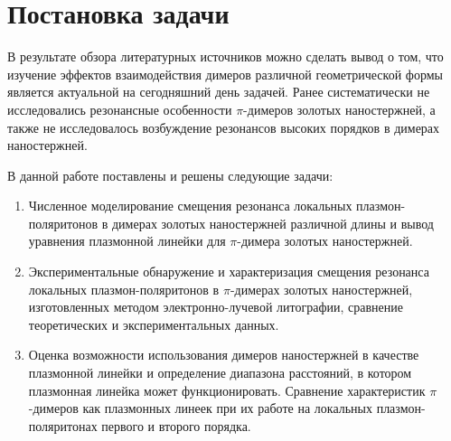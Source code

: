 \section{Постановка задачи}

В результате обзора литературных источников можно сделать вывод о том, что изучение эффектов взаимодействия димеров различной геометрической формы  является актуальной на сегодняшний день задачей. Ранее систематически не исследовались резонансные особенности $ \pi $-димеров золотых наностержней, а также не исследовалось возбуждение резонансов высоких порядков в димерах наностержней.

В данной работе поставлены и решены следующие задачи:
\begin{enumerate}
\item Численное моделирование смещения резонанса локальных плазмон-поляритонов в димерах золотых наностержней различной длины и вывод уравнения плазмонной линейки для $ \pi $-димера золотых наностержней.
\item Экспериментальные обнаружение и характеризация смещения резонанса локальных плазмон-поляритонов в $ \pi $-димерах золотых наностержней, изготовленных методом электронно-лучевой литографии, сравнение теоретических и экспериментальных данных.
\item Оценка возможности использования димеров наностержней в качестве плазмонной линейки и определение диапазона расстояний, в котором плазмонная линейка может функционировать. Сравнение характеристик $ \pi $-димеров как плазмонных линеек при их работе на локальных плазмон-поляритонах первого и второго порядка.
\end{enumerate}